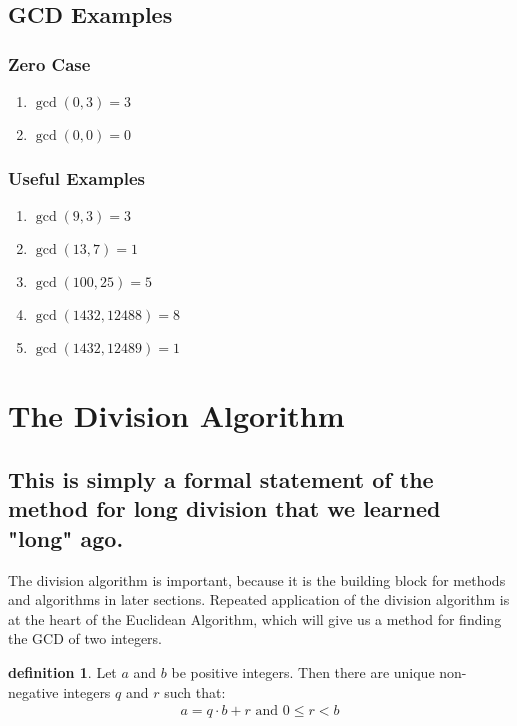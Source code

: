\documentclass[10pt]{article}
\theoremstyle{definition}
\newtheorem{definition}[theorem]{definition}
\theoremstyle{remark}
\begin{document}
\subsection{GCD Examples}
\subsubsection{Zero Case}
\begin{enumerate}
\item $\gcd(0,3)=3$
\item $\gcd(0,0)=0$ 
\end{enumerate}
\subsubsection{Useful Examples}
\begin{enumerate}
\item $\gcd(9,3)=3$
\item $\gcd(13,7)=1$ 
\item $\gcd(100,25)=5$ 
\item $\gcd(1432,12488)=8$ 
\item $\gcd(1432,12489)=1$ 
\end{enumerate}
\section{The Division Algorithm}
\subsection{This is simply a formal statement of the method for long division that we learned "long" ago.}
The division algorithm is important, because it is the building block for methods and algorithms in later sections.  Repeated application of the division algorithm is at the heart of the Euclidean Algorithm, which will give us a method for finding the GCD of two integers.
\begin{definition}
Let $a$ and $b$ be positive integers.  Then there are unique non-negative integers $q$ and $r$ such that:
\begin{align*}
a =q\cdot b + r \text{ and } 0 \leq r < b\\
\end{align*}
\end{definition}
\end{document}
